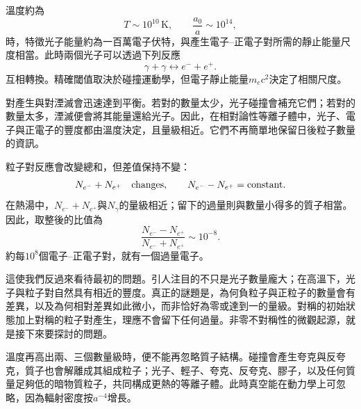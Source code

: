 溫度約為
\begin{equation}
T\sim10^{10}\,\mathrm{K},
\qquad
\frac{a_0}{a}\sim10^{14},
\end{equation}
時，特徵光子能量約為一百萬電子伏特，與產生電子--正電子對所需的靜止能量尺度相當。此時兩個光子可以透過下列反應
\begin{equation}
\gamma+\gamma
\longleftrightarrow
e^-+e^+.
\label{eq:c07-pair-reaction}
\end{equation}
互相轉換。精確閾值取決於碰撞運動學，但電子靜止能量\(m_ec^2\)決定了相關尺度。

對產生與對湮滅會迅速達到平衡。若對的數量太少，光子碰撞會補充它們；若對的數量太多，湮滅便會將其能量還給光子。因此，在相對論性等離子體中，光子、電子與正電子的豐度都由溫度決定，且量級相近。它們不再簡單地保留日後粒子數量的資訊。

\begin{classroomqa}
\end{classroomqa}

粒子對反應會改變總和，但差值保持不變：
\begin{equation}
N_{e^-}+N_{e^+}\quad\hbox{changes},
\qquad
N_{e^-}-N_{e^+}=\hbox{constant}.
\label{eq:c07-pair-invariants}
\end{equation}
在熱湯中，\(N_{e^-}+N_{e^+}\)與\(N_\gamma\)的量級相近；留下的過量則與數量小得多的質子相當。因此，取整後的比值為
\begin{equation}
\boxed{
\frac{N_{e^-}-N_{e^+}}
{N_{e^-}+N_{e^+}}
\sim10^{-8}
}.
\label{eq:c07-asymmetry}
\end{equation}
約每\(10^8\)個電子--正電子對，就有一個過量電子。

這使我們反過來看待最初的問題。引人注目的不只是光子數量龐大；在高溫下，光子與粒子對自然具有相近的豐度。真正的謎題是，為何負粒子與正粒子的數量會有差異，以及為何相對差異如此微小，而非恰好為零或達到一的量級。對稱的初始狀態加上對稱的粒子對產生，理應不會留下任何過量。非零不對稱性的微觀起源，就是接下來要探討的問題。

溫度再高出兩、三個數量級時，便不能再忽略質子結構。碰撞會產生夸克與反夸克，質子也會解離成其組成粒子；光子、輕子、夸克、反夸克、膠子，以及任何質量足夠低的暗物質粒子，共同構成更熱的等離子體。此時真空能在動力學上可忽略，因為輻射密度按\(a^{-4}\)增長。

